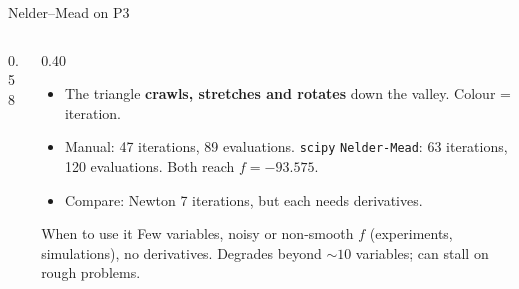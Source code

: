 \begin{frame}{Nelder--Mead on P3}
  \begin{columns}[T]
    \begin{column}{0.58\textwidth}
    \end{column}
    \begin{column}{0.40\textwidth}
      \small
      \begin{itemize}
        \item The triangle \textbf{crawls, stretches and rotates} down the valley. Colour = iteration.
        \item Manual: 47 iterations, 89 evaluations. \texttt{scipy} \texttt{Nelder-Mead}: 63 iterations, 120 evaluations. Both reach $f=-93.575$.
        \item Compare: Newton 7 iterations, but each needs derivatives.
      \end{itemize}
      \begin{alertblock}{When to use it}
        Few variables, noisy or non-smooth $f$ (experiments, simulations), no derivatives. Degrades beyond $\sim10$ variables; can stall on rough problems.
      \end{alertblock}
    \end{column}
  \end{columns}
\end{frame}
